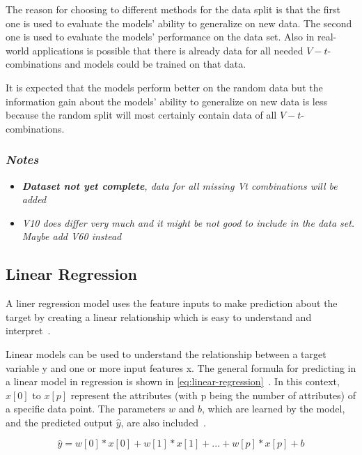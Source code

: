 The reason for choosing to different methods for the data split is that the first one is used to
evaluate the models'
ability to generalize on new data. The second one is used to evaluate the models' performance on
the data set.
Also in real-world applications is possible that there is already data for all needed
$V-t$-combinations and models
could be trained on that data.

It is expected that the models perform better on the random data but the information gain about
the models' ability
to generalize on new data is less because the random split will most certainly contain data of
all $V-t$-combinations.

\subsubsection*{\textit{Notes}}
\begin{itemize}
    \item \textit{\textbf{Dataset not yet complete}, data for all missing Vt combinations will be
    added}
    \item \textit{V10 does differ very much and it might be not good to include in the data set.
    Maybe add V60 instead}
\end{itemize}

\subsection{Linear Regression}\label{subsec:linear-regression}
A liner regression model uses the feature inputs to make prediction about the target by
creating a linear relationship which is easy to understand and interpret~\cite[p.
37]{molnar2020interpretable}.

Linear models can be used to understand the relationship between a target variable y and one or
more input features x.
The general formula for predicting in a linear model in regression is shown in
\ref{eq:linear-regression}~\cite[p. 45]{muller_introductionmachinelearning_2016}.
In this context, $x[0]$ to $x[p]$ represent the attributes (with p being the number of
attributes) of
a specific data point. The parameters $w$ and $b$, which are learned by the model, and the predicted
output $\hat{y}$, are also included~\cite[p. 45]{muller_introductionmachinelearning_2016}.

\begin{tcolorbox}[arc=0pt,boxrule=0.5pt]
    \begin{equation}
        \hat{y} = w[0] * x[0] + w[1] * x[1] + ... + w[p] * x[p] + b
    \end{equation}
    \label{eq:linear-regression}
\end{tcolorbox}

